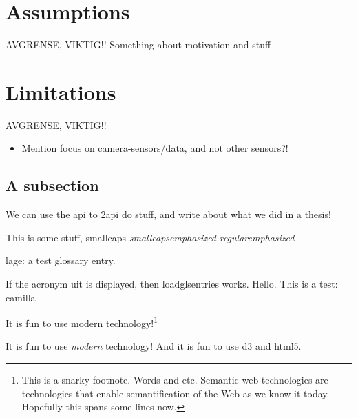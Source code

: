 \documentclass[USenglish]{uit-thesis}
\begin{document}
\section{Assumptions}
AVGRENSE, VIKTIG!!
Something about motivation and stuff

\section{Limitations}
AVGRENSE, VIKTIG!!

\begin{itemize}
\item Mention focus on camera-sensors/data, and not other sensors?!
\end{itemize}





\iffalse
\subsection{A subsection}

We can use the \ac{api} to \ac{2api} do stuff, and write about what we did in a \gls{thesis}!

This is some stuff, {\sc smallcaps {\em smallcapsemphasized}} {\em regularemphasized}

\Gls{lage}: a test glossary entry.

If the acronym \ac{uit} is displayed, then loadglsentries works.
Hello. This is a test: \ac{camilla}

It is fun to use modern  technology!\footnote{This is a snarky footnote. Words and etc. Semantic web technologies are technologies that enable semantification of the Web as we know it today. Hopefully this spans some lines now.}

It is fun to use \emph{modern } technology! And it is fun to use \ac{d3} and \ac{html5}.
\end{document}

